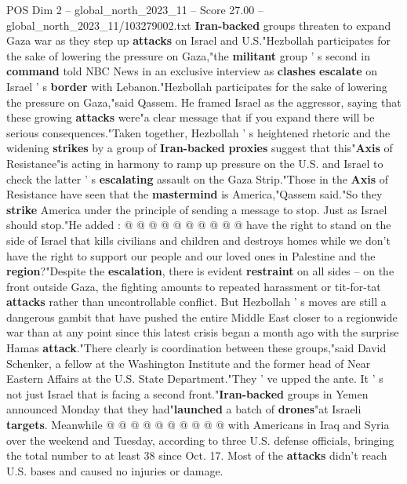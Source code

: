 \begin{textsample}{POS Dim 2 – global\_north\_2023\_11 – Score 27.00 – global\_north\_2023\_11/103279002.txt}  \label{ex:f2_pos_301}
\textbf{Iran-backed} groups threaten to expand Gaza war as they step up \textbf{attacks} on Israel and U.S."Hezbollah participates for the sake of lowering the pressure on Gaza,"the \textbf{militant} group ' s second in \textbf{command} told NBC News in an exclusive interview as \textbf{clashes} \textbf{escalate} on Israel ' s \textbf{border} with Lebanon."Hezbollah participates for the sake of lowering the pressure on Gaza,"said Qassem.
He framed Israel as the aggressor, saying that these growing \textbf{attacks} were"a clear message that if you expand there will be serious consequences."Taken together, Hezbollah ' s heightened rhetoric and the widening \textbf{strikes} by a group of \textbf{Iran-backed} \textbf{proxies} suggest that this"\textbf{Axis} of Resistance"is acting in harmony to ramp up pressure on the U.S. and Israel to check the latter ' s \textbf{escalating} assault on the Gaza Strip."Those in the \textbf{Axis} of Resistance have seen that the \textbf{mastermind} is America,"Qassem said."So they \textbf{strike} America under the principle of sending a message to stop.
Just as Israel should stop."He added : @ @ @ @ @ @ @ @ @ @ have the right to stand on the side of Israel that kills civilians and children and destroys homes while we don't have the right to support our people and our loved ones in Palestine and the \textbf{region}?"Despite the \textbf{escalation}, there is evident \textbf{restraint} on all sides -- on the front outside Gaza, the fighting amounts to repeated harassment or tit-for-tat \textbf{attacks} rather than uncontrollable conflict.
But Hezbollah ' s moves are still a dangerous gambit that have pushed the entire Middle East closer to a regionwide war than at any point since this latest crisis began a month ago with the surprise Hamas \textbf{attack}."There clearly is coordination between these groups,"said David Schenker, a fellow at the Washington Institute and the former head of Near Eastern Affairs at the U.S.
State Department."They ' ve upped the ante.
It ' s not just Israel that is facing a second front."\textbf{Iran-backed} groups in Yemen announced Monday that they had"\textbf{launched} a batch of \textbf{drones}"at Israeli \textbf{targets}.
Meanwhile @ @ @ @ @ @ @ @ @ @ with Americans in Iraq and Syria over the weekend and Tuesday, according to three U.S. defense officials, bringing the total number to at least 38 since Oct. 17.
Most of the \textbf{attacks} didn't reach U.S. bases and caused no injuries or damage.

\end{textsample}
